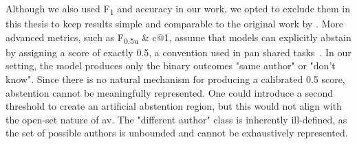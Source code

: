 
Although we also used F\textsubscript{1} and accuracy in our work, we opted to exclude them in this thesis to keep results simple and comparable to the original work by \citet{koppel_determining_2014}.
More advanced metrics, such as F\textsubscript{0.5u} \& c@1, assume that models can explicitly abstain by assigning a score of exactly 0.5, a convention used in \ac{pan} shared tasks~\citep{tyo_state_2022,bevendorff_overview_2024,kocher_unine_2015}. 
In our setting, the model produces only the binary outcomes "same author" or "don't know". 
Since there is no natural mechanism for producing a calibrated 0.5 score, abstention cannot be meaningfully represented. 
One could introduce a second threshold to create an artificial abstention region, but this would not align with the open-set nature of \ac{av}. 
The "different author" class is inherently ill-defined, as the set of possible authors is unbounded and cannot be exhaustively represented. 

